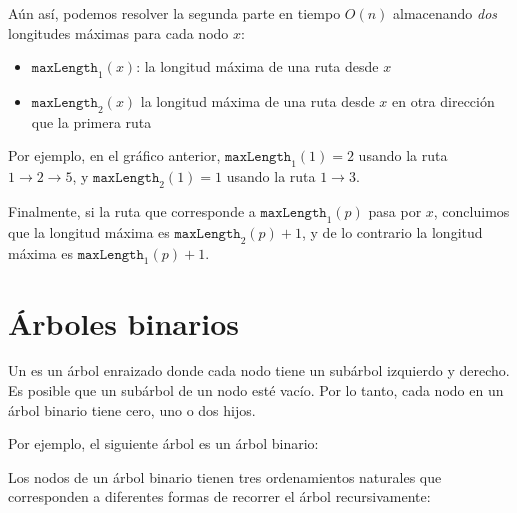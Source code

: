 Aún así, podemos resolver la segunda parte en
tiempo $O(n)$ almacenando \emph{dos} longitudes máximas
para cada nodo $x$:
\begin{itemize}
\item $\texttt{maxLength}_1(x)$:
la longitud máxima de una ruta desde $x$
\item $\texttt{maxLength}_2(x)$
la longitud máxima de una ruta desde $x$
en otra dirección que la primera ruta
\end{itemize}
Por ejemplo, en el gráfico anterior,
$\texttt{maxLength}_1(1)=2$
usando la ruta $1 \rightarrow 2 \rightarrow 5$,
y $\texttt{maxLength}_2(1)=1$
usando la ruta $1 \rightarrow 3$.

Finalmente, si la ruta que corresponde a
$\texttt{maxLength}_1(p)$ pasa por $x$,
concluimos que la longitud máxima es
$\texttt{maxLength}_2(p)+1$,
y de lo contrario la longitud máxima es
$\texttt{maxLength}_1(p)+1$.


\section{Árboles binarios}


\begin{samepage}
Un  es un árbol enraizado
donde cada nodo tiene un subárbol izquierdo y derecho.
Es posible que un subárbol de un nodo esté vacío.
Por lo tanto, cada nodo en un árbol binario tiene
cero, uno o dos hijos.

Por ejemplo, el siguiente árbol es un árbol binario:
\begin{center}
\end{center}
\end{samepage}


Los nodos de un árbol binario tienen tres ordenamientos naturales
que corresponden a diferentes formas de
recorrer el árbol recursivamente:

